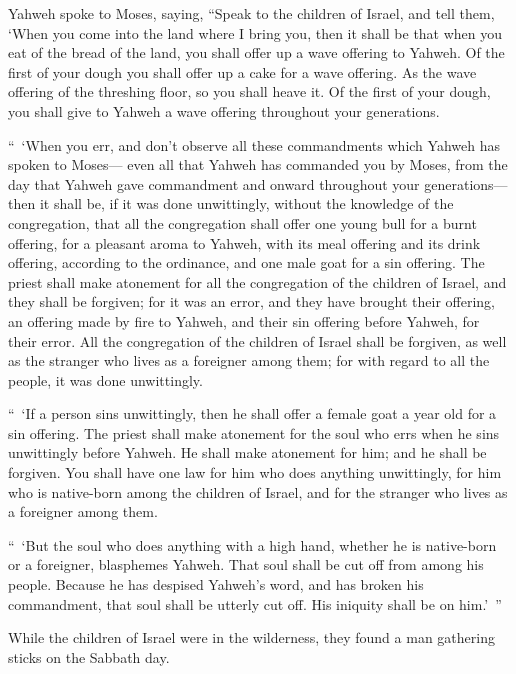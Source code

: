 {\par }{\PP {}Yahweh spoke to Moses, saying,
“Speak to the children of Israel, and tell them, ‘When you come into the land where I bring you,
then it shall be that when you eat of the bread of the land, you shall offer up a wave offering to Yahweh.
Of the first of your dough you shall offer up a cake for a wave offering. As the wave offering of the threshing floor, so you shall heave it.
Of the first of your dough, you shall give to Yahweh a wave offering throughout your generations.
\par }{\PP {}“ ‘When you err, and don’t observe all these commandments which Yahweh has spoken to Moses—
even all that Yahweh has commanded you by Moses, from the day that Yahweh gave commandment and onward throughout your generations—
then it shall be, if it was done unwittingly, without the knowledge of the congregation, that all the congregation shall offer one young bull for a burnt offering, for a pleasant aroma to Yahweh, with its meal offering and its drink offering, according to the ordinance, and one male goat for a sin offering.
The priest shall make atonement for all the congregation of the children of Israel, and they shall be forgiven; for it was an error, and they have brought their offering, an offering made by fire to Yahweh, and their sin offering before Yahweh, for their error.
All the congregation of the children of Israel shall be forgiven, as well as the stranger who lives as a foreigner among them; for with regard to all the people, it was done unwittingly.
\par }{\PP {}“ ‘If a person sins unwittingly, then he shall offer a female goat a year old for a sin offering.
The priest shall make atonement for the soul who errs when he sins unwittingly before Yahweh. He shall make atonement for him; and he shall be forgiven.
You shall have one law for him who does anything unwittingly, for him who is native-born among the children of Israel, and for the stranger who lives as a foreigner among them.
\par }{\PP {}“ ‘But the soul who does anything with a high hand, whether he is native-born or a foreigner, blasphemes Yahweh. That soul shall be cut off from among his people.
Because he has despised Yahweh’s word, and has broken his commandment, that soul shall be utterly cut off. His iniquity shall be on him.’ ”
\par }{\PP {}While the children of Israel were in the wilderness, they found a man gathering sticks on the Sabbath day.
}
